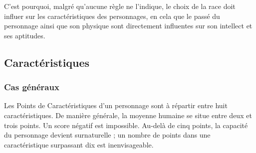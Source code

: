 C’est pourquoi, malgré qu’aucune règle ne l’indique, le choix de la race doit influer sur les caractéristiques des personnages, en cela que le passé du personnage ainsi que son physique sont directement influentes sur son intellect et ses aptitudes.

\subsection{Caractéristiques}
\subsubsection{Cas généraux}

Les Points de Caractéristiques d’un personnage sont à répartir entre huit caractéristiques. De manière générale, la moyenne humaine se situe entre deux et trois points. Un score négatif est impossible. Au-delà de cinq points, la capacité du personnage devient surnaturelle ; un nombre de points dans une caractéristique surpassant dix est inenvisageable.\\

